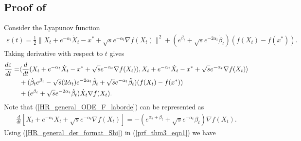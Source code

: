 \documentclass{article}
\theoremstyle{plain}
\theoremstyle{definition}
\theoremstyle{remark}
\begin{document}
\subsection{Proof of }\label{thm3_proof}
Consider the Lyapunov function 
\begin{align}\label{lyap_theorem3}
    \varepsilon(t)=\frac{1}{2}\|X_t+e^{-\alpha_t}\dot X_t-x^*+\sqrt{s}e^{-\alpha_t}\nabla f(X_t)\|^2+(e^{\beta_t}+\sqrt{s}e^{-2\alpha_t}\dot \beta_t)(f(X_t)-f(x^*)).
\end{align}
Taking derivative with respect to $t$ gives
\begin{align}\label{prf_thm3_eqn1}
    \frac{d \varepsilon}{dt}=&\langle \frac{d}{dt}(X_t+e^{-\alpha_t}\dot X_t-x^*+\sqrt{s}e^{-\alpha_t}\nabla f(X_t)),X_t+e^{-\alpha_t}\dot X_t-x^*+\sqrt{s}e^{-\alpha_t}\nabla f(X_t)\rangle\nonumber\\
    & +(\dot \beta_te^{\beta_t}-\sqrt{s}(2\dot \alpha_t)e^{-2\alpha_t}\dot \beta_t +\sqrt{s}e^{-\alpha_t}\Ddot{\beta_t})(f(X_t)-f(x^*))\nonumber\\
    &+(e^{\beta_t}+\sqrt{s}e^{-2\alpha_t}\dot \beta_t)\dot X_t\nabla f(X_t).
\end{align}
Note that (\ref{HR_general_ODE_F_laborde}) can be represented as
\begin{align}\label{HR_general_der_format_Shi}
    \frac{d}{dt}\left[X_t+e^{-\alpha_t}\dot X_t+\sqrt{s}e^{-\alpha_t}\nabla f(X_t)\right]=-\left(e^{\alpha_t+\beta_t}+\sqrt{s}e^{-\alpha_t}\dot \beta_t \right)\nabla f(X_t).
\end{align}
Using (\ref{HR_general_der_format_Shi}) in (\ref{prf_thm3_eqn1}) we have
\end{document}
